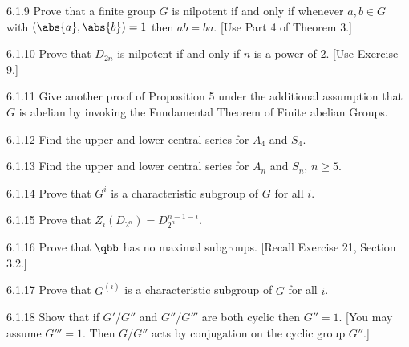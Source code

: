 \begin{exercise}{6.1.9}
    Prove that a finite group $G$ is nilpotent if and only if whenever $a, b \in G$ with $(\abs{a}, \abs{b}) = 1$ then $ab = ba$.
    [Use Part 4 of Theorem 3.]
\end{exercise}

\begin{exercise}{6.1.10}
    Prove that $D_{2n}$ is nilpotent if and only if $n$ is a power of $2$.
    [Use Exercise 9.]
\end{exercise}

\begin{exercise}{6.1.11}
    Give another proof of Proposition 5 under the additional assumption that $G$ is abelian by invoking the Fundamental Theorem of Finite abelian Groups.
\end{exercise}

\begin{exercise}{6.1.12}
    Find the upper and lower central series for $A_4$ and $S_4$.
\end{exercise}

\begin{exercise}{6.1.13}
    Find the upper and lower central series for $A_n$ and $S_n$, $n \geq 5$.
\end{exercise}

\begin{exercise}{6.1.14}
    Prove that $G^i$ is a characteristic subgroup of $G$ for all $i$.
\end{exercise}

\begin{exercise}{6.1.15}
    Prove that $Z_i(D_{2^n}) = D_{2^n}^{n-1-i}$.
\end{exercise}

\begin{exercise}{6.1.16}
    Prove that $\qbb$ has no maximal subgroups.
    [Recall Exercise 21, Section 3.2.]
\end{exercise}

\begin{exercise}{6.1.17}
    Prove that $G^{(i)}$ is a characteristic subgroup of $G$ for all $i$.
\end{exercise}

\begin{exercise}{6.1.18}
    Show that if $G'/G''$ and $G''/G'''$ are both cyclic then $G'' = 1$.
    [You may assume $G''' = 1$. Then $G/G''$ acts by conjugation on the cyclic group $G''$.]
\end{exercise}

